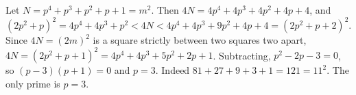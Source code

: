Let $N=p^4+p^3+p^2+p+1=m^2$. Then $4N=4p^4+4p^3+4p^2+4p+4$, and
\[
(2p^2+p)^2=4p^4+4p^3+p^2<4N<4p^4+4p^3+9p^2+4p+4=(2p^2+p+2)^2 .
\]
Since $4N=(2m)^2$ is a square strictly between two squares two apart, $4N=(2p^2+p+1)^2=4p^4+4p^3+5p^2+2p+1$. Subtracting, $p^2-2p-3=0$, so $(p-3)(p+1)=0$ and $p=3$. Indeed $81+27+9+3+1=121=11^2$. The only prime is $\boxed{p=3}$.
